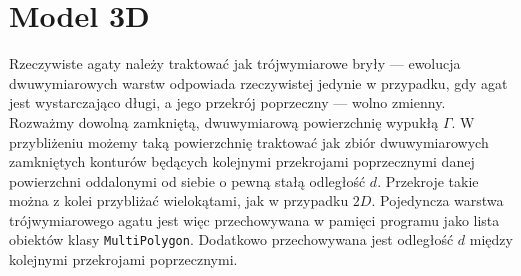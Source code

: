 \documentclass{article}
\begin{document}
\section{Model 3D}
Rzeczywiste agaty należy traktować jak trójwymiarowe bryły --- ewolucja dwuwymiarowych warstw odpowiada rzeczywistej jedynie w przypadku, gdy agat jest wystarczająco długi, a jego przekrój poprzeczny --- wolno zmienny. Rozważmy dowolną zamkniętą, dwuwymiarową powierzchnię wypukłą $\Gamma$. W przybliżeniu możemy taką powierzchnię traktować jak zbiór dwuwymiarowych zamkniętych konturów będących kolejnymi przekrojami poprzecznymi danej powierzchni oddalonymi od siebie o pewną stałą odległość $d$. Przekroje takie można z kolei przybliżać wielokątami, jak w przypadku $2D$. Pojedyncza warstwa trójwymiarowego agatu jest więc przechowywana w pamięci programu jako lista obiektów klasy \texttt{MultiPolygon}. Dodatkowo przechowywana jest odległość $d$ między kolejnymi przekrojami poprzecznymi.
\end{document}
